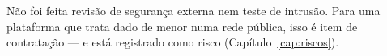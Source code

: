\begin{limitacao}
Não foi feita revisão de segurança externa nem teste de intrusão. Para uma
plataforma que trata dado de menor numa rede pública, isso é item de
contratação --- e está registrado como risco 
(Capítulo~\ref{cap:riscos}).
\end{limitacao}
